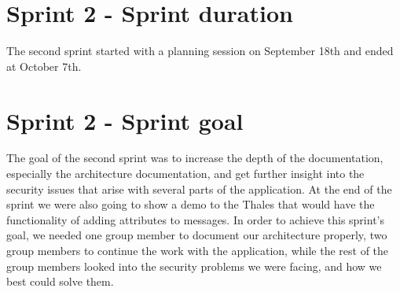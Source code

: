 \section{Sprint 2 - Sprint duration}
The second sprint started with a planning session on September 18th and ended at October 7th. 

\section{Sprint 2 - Sprint goal}
The goal of the second sprint was to increase the depth of the documentation, especially the architecture documentation, and get further insight into the security issues that arise with several parts of the application. 
\newline
\newline
At the end of the sprint we were also going to show a demo to the Thales that would have the functionality of adding attributes to messages. 
\newline
\newline
In order to achieve this sprint’s goal, we needed one group member to document our architecture properly, two group members to continue the work with the application, while the rest of the group members looked into the security problems we were facing, and how we best could solve them.